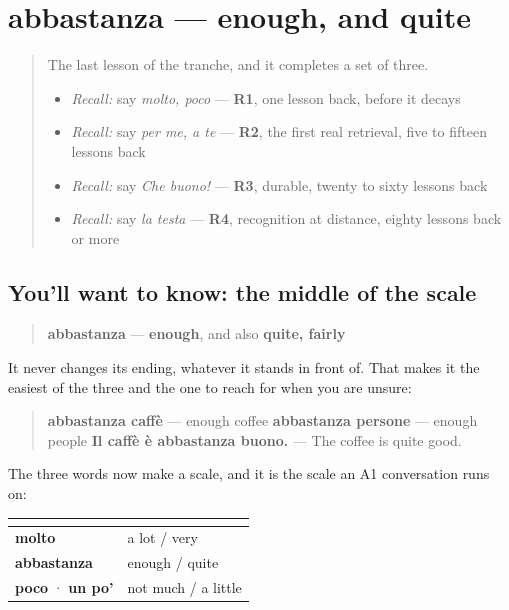 \section[abbastanza]{abbastanza — enough, and quite}

\label{lesson:IT-C35-abbastanza}



\begin{quote}
The last lesson of the tranche, and it completes a set of three.

\begin{itemize}
\raggedright
  \item \emph{Recall:} say \emph{molto, poco} — \textbf{R1}, one lesson back, before it decays
  \item \emph{Recall:} say \emph{per me, a te} — \textbf{R2}, the first real retrieval, five to fifteen lessons back
  \item \emph{Recall:} say \emph{Che buono!} — \textbf{R3}, durable, twenty to sixty lessons back
  \item \emph{Recall:} say \emph{la testa} — \textbf{R4}, recognition at distance, eighty lessons back or more
\end{itemize}
\end{quote}

\subsection*{You'll want to know: the middle of the scale}
\begin{quote}
\textbf{abbastanza} — \textbf{enough}, and also \textbf{quite, fairly}
\end{quote}

It never changes its ending, whatever it stands in front of. That makes it the easiest of the three and the one to reach for when you are unsure:

\begin{quote}
\textbf{abbastanza caffè} — enough coffee \textbf{abbastanza persone} — enough people \textbf{Il caffè è abbastanza buono.} — The coffee is quite good.
\end{quote}

The three words now make a scale, and it is the scale an A1 conversation runs on:

\noindent
\begin{tabularx}{\linewidth}{@{}>{\raggedright\arraybackslash}X>{\raggedright\arraybackslash}X@{}}
\toprule
\textbf{} & \textbf{} \\
\midrule
\textbf{molto} & a lot / very \\
\textbf{abbastanza} & enough / quite \\
\textbf{poco} · \textbf{un po'} & not much / a little \\
\bottomrule
\end{tabularx}

